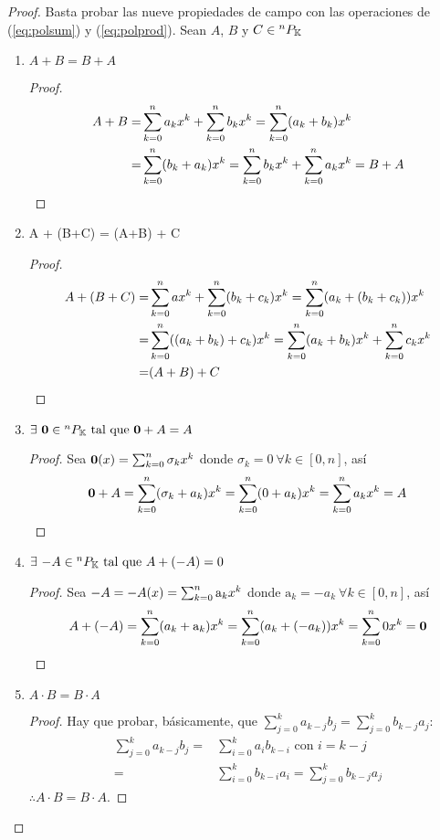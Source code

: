 \begin{proof}
Basta probar las nueve propiedades de campo con las operaciones de (\ref{eq:polsum}) y (\ref{eq:polprod}).
Sean $A$, $B$ y $C \in {^{n}P_{\mathbb{K}}}$
\begin{enumerate}

 \item $ A + B = B + A $
 \begin{proof}
  \begin{align*}
   A + B =& \sum_{k=0}^n a_k x^k + \sum_{k=0}^n b_k x^k  = \sum_{k=0}^n (a_k + b_k) x^k \\ 
   =& \sum_{k=0}^n (b_k + a_k) x^k = \sum_{k=0}^n b_k x^k +     \sum_{k=0}^n a_k x^k = B + A
  \end{align*}
 \end{proof}
 
 \item A + (B+C) = (A+B) + C
 \begin{proof}
  \begin{align*}
   A + (B+C) =& \sum_{k=0}^n a x^k + \sum_{k=0}^n (b_k+c_k) x^k = \sum_{k=0}^n (a_k + (b_k + c_k)) x^k \\
   =&  \sum_{k=0}^n ((a_k + b_k) + c_k) x^k = \sum_{k=0}^n (a_k+b_k) x^k + \sum_{k=0}^n c_k x^k \\
   =& (A+B) + C 
  \end{align*}
 \end{proof}
 
 \item $\exists \  \bm{0} \in {^{n}P_{\mathbb{K}}} \text{ tal que }  \bm{0} + A = A $
 \begin{proof}
 Sea $\bm{0}(x) = \sum_{k=0}^n \sigma_k x^k$ donde $\sigma_k = 0 \ \forall k \in [0,n]$, así 
  \begin{align*}
  \bm{0} + A = \sum_{k=0}^n (\sigma_k + a_k) x^k = \sum_{k=0}^n (0 + a_k) x^k = \sum_{k=0}^n a_k x^k = A
  \end{align*}
 \end{proof}
 
 \item $\exists \ {-A} \in{^{n}P_{\mathbb{K}}}  \text{ tal que } A + (-A) = 0 $
 \begin{proof}
 Sea $-A = -A(x) = \sum_{k=0}^n \mathrm{a}_k x^k$ donde $\mathrm{a}_k = -a_k \ \forall k \in [0,n]$, así
  \begin{align*}
   A + (-A) = \sum_{k=0}^n (a_k + \mathrm{a}_k) x^k = \sum_{k=0}^n (a_k + (-a_k)) x^k = \sum_{k=0}^n 0 x^k = \bm{0}
  \end{align*}
 \end{proof}
 
 \item $ A\cdot B = B\cdot A $
 \begin{proof}
 Hay que probar, básicamente, que $\sum_{j=0}^k{a_{k-j}b_j} = \sum_{j=0}^k{b_{k-j}a_j}$:
  \begin{align*} 
   \sum_{j=0}^k{a_{k-j}b_j} =& \sum_{i=0}^k{a_ib_{k-i}} \text{ con } i = k - j \\
   =& \sum_{i=0}^k{ b_{k-i}a_i } = \sum_{j=0}^k { b_{k-j}a_j }
  \end{align*}
  $\therefore A\cdot B = B\cdot A$.
 \end{proof}
 

\end{enumerate}
\end{proof}
